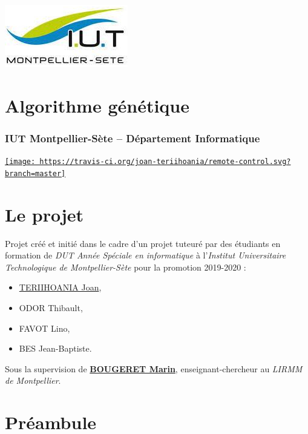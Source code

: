 \includegraphics{.ressources/logo.jpeg}

\hypertarget{algorithme-guxe9nuxe9tique}{%
\section{Algorithme génétique}\label{algorithme-guxe9nuxe9tique}}

\hypertarget{iut-montpellier-suxe8te--duxe9partement-informatique}{%
\subsubsection{IUT Montpellier-Sète -- Département
Informatique}\label{iut-montpellier-suxe8te--duxe9partement-informatique}}

\href{https://travis-ci.org/joan-teriihoania/remote-control}{\texttt{[image: https://travis-ci.org/joan-teriihoania/remote-control.svg?branch=master]}}

\hypertarget{le-projet}{%
\section{Le projet}\label{le-projet}}

Projet créé et initié dans le cadre d'un projet tuteuré par des
étudiants en formation de \emph{DUT Année Spéciale en informatique} à
l'\emph{Institut Universitaire Technologique de Montpellier-Sète} pour
la promotion 2019-2020 :

\begin{itemize}
\tightlist
\item
  \href{http://joan-teriihoania.fr/}{TERIIHOANIA Joan},
\item
  ODOR Thibault,
\item
  FAVOT Lino,
\item
  BES Jean-Baptiste.
\end{itemize}

Sous la supervision de
\textbf{\href{http://www.lirmm.fr/~bougeret/}{BOUGERET Marin}},
enseignant-chercheur au \emph{LIRMM de Montpellier}.

\hypertarget{pruxe9ambule}{%
\section{Préambule}\label{pruxe9ambule}}

